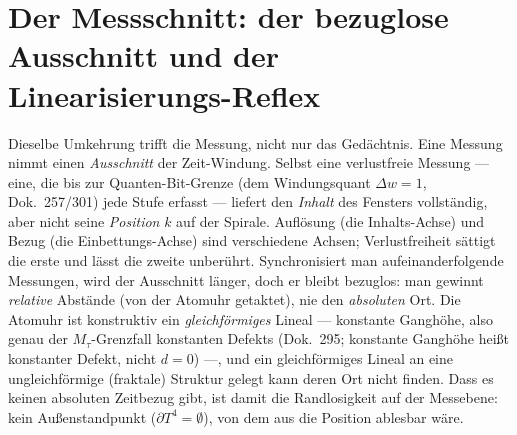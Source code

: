 \section{Der Messschnitt: der bezuglose Ausschnitt und der Linearisierungs-Reflex}

Dieselbe Umkehrung trifft die Messung, nicht nur das Gedächtnis. Eine Messung nimmt einen
\emph{Ausschnitt} der Zeit-Windung. Selbst eine verlustfreie Messung --- eine, die bis zur
Quanten-Bit-Grenze (dem Windungsquant $\Delta w = 1$, Dok.~257/301) jede Stufe erfasst ---
liefert den \emph{Inhalt} des Fensters vollständig, aber nicht seine \emph{Position} $k$
auf der Spirale. Auflösung (die Inhalts-Achse) und Bezug (die Einbettungs-Achse) sind
verschiedene Achsen; Verlustfreiheit sättigt die erste und lässt die zweite unberührt.
Synchronisiert man aufeinanderfolgende Messungen, wird der Ausschnitt länger, doch er
bleibt bezuglos: man gewinnt \emph{relative} Abstände (von der Atomuhr getaktet), nie den
\emph{absoluten} Ort. Die Atomuhr ist konstruktiv ein \emph{gleichförmiges} Lineal ---
konstante Ganghöhe, also genau der $M_\tau$-Grenzfall konstanten Defekts (Dok.~295;
konstante Ganghöhe heißt konstanter Defekt, nicht $d = 0$) ---, und ein
gleichförmiges Lineal an eine ungleichförmige (fraktale) Struktur gelegt kann deren Ort
nicht finden. Dass es keinen absoluten Zeitbezug gibt, ist damit die Randlosigkeit auf der
Messebene: kein Außenstandpunkt ($\partial T^4 = \emptyset$), von dem aus die Position
ablesbar wäre.

